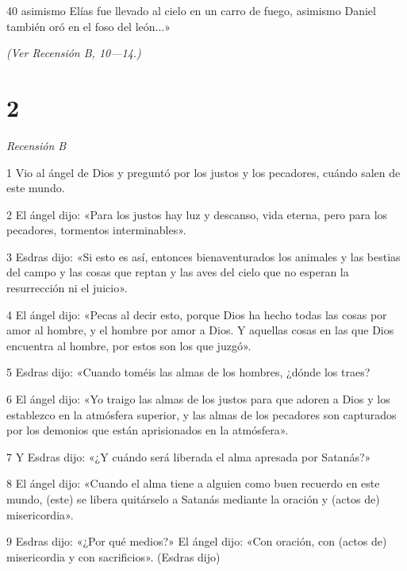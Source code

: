 \par 40 asimismo Elías fue llevado al cielo en un carro de fuego, asimismo Daniel también oró en el foso del león...»

\par \textit{(Ver Recensión B, 10—14.)}

\chapter{2}

\par \textit{Recensión B}

\par 1 Vio al ángel de Dios y preguntó por los justos y los pecadores, cuándo salen de este mundo.

\par 2 El ángel dijo: «Para los justos hay luz y descanso, vida eterna, pero para los pecadores, tormentos interminables».

\par 3 Esdras dijo: «Si esto es así, entonces bienaventurados los animales y las bestias del campo y las cosas que reptan y las aves del cielo que no esperan la resurrección ni el juicio».

\par 4 El ángel dijo: «Pecas al decir esto, porque Dios ha hecho todas las cosas por amor al hombre, y el hombre por amor a Dios. Y aquellas cosas en las que Dios encuentra al hombre, por estos son los que juzgó».

\par 5 Esdras dijo: «Cuando toméis las almas de los hombres, ¿dónde los traes?

\par 6 El ángel dijo: «Yo traigo las almas de los justos para que adoren a Dios y los establezco en la atmósfera superior, y las almas de los pecadores son capturados por los demonios que están aprisionados en la atmósfera».

\par 7 Y Esdras dijo: «¿Y cuándo será liberada el alma apresada por Satanás?»

\par 8 El ángel dijo: «Cuando el alma tiene a alguien como buen recuerdo en este mundo, (este) se libera quitárselo a Satanás mediante la oración y (actos de) misericordia».

\par 9 Esdras dijo: «¿Por qué medios?» El ángel dijo: «Con oración, con (actos de) misericordia y con sacrificios». (Esdras dijo)


